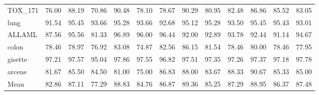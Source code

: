 \begin{table}[h]
{\begin{tabular}{lllllllllllll}
TOX\_171 & 76.00 & 88.19 & 70.86 & 90.48 & 78.10 & 78.67 & 90.29 & 80.95 & 82.48 & 86.86 & 85.52 & 83.05 \\
lung & 91.54 & 95.45 & 93.66 & 95.28 & 93.66 & 92.68 & 95.12 & 95.28 & 93.50 & 95.45 & 95.43 & 93.01 \\
ALLAML & 87.56 & 95.56 & 81.33 & 96.89 & 96.00 & 96.44 & 92.00 & 92.89 & 93.78 & 92.44 & 91.14 & 94.67 \\
colon & 78.46 & 78.97 & 76.92 & 83.08 & 74.87 & 82.56 & 86.15 & 81.54 & 78.46 & 80.00 & 78.46 & 77.95 \\
gisette & 97.21 & 97.57 & 95.04 & 97.86 & 97.55 & 96.82 & 97.51 & 97.35 & 97.26 & 97.37 & 97.18 & 97.78 \\
arcene & 81.67 & 85.50 & 84.50 & 81.00 & 75.00 & 86.83 & 88.00 & 83.67 & 88.33 & 90.67 & 85.33 & 85.00 \\
\midrule
Mean & 82.86 & 87.11 & 77.29 & 88.83 & 84.76 & 86.87 & 89.36 & 85.25 & 87.29 & 88.95 & 86.37 & 87.48 \\
\bottomrule
\end{tabular}
}
    \label{tab:high_dimension_results}
\end{table}

